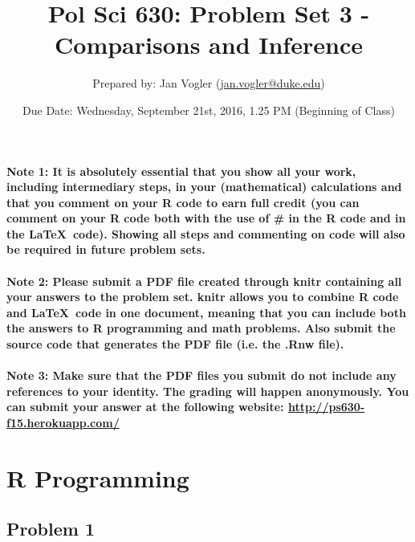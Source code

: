 \documentclass[12pt,letter]{article}
\begin{document}
\title{Pol Sci 630: Problem Set 3 - Comparisons and Inference}

\author{Prepared by: Jan Vogler (\href{mailto:jan.vogler@duke.edu}{jan.vogler@duke.edu})}

\date{Due Date: Wednesday, September 21st, 2016, 1.25 PM (Beginning of Class)}
 
\maketitle 



\paragraph{Note 1: It is absolutely essential that you show all your work, including intermediary steps, in your (mathematical) calculations and that you comment on your R code to earn full credit (you can comment on your R code both with the use of \# in the R code and in the \LaTeX \ code). Showing all steps and commenting on code will also be required in future problem sets.}

\paragraph{Note 2: Please submit a PDF file created through knitr containing all your answers to the problem set. knitr allows you to combine R code and \LaTeX \ code in one document, meaning that you can include both the answers to R programming and math problems. Also submit the source code that generates the PDF file (i.e. the .Rnw file).}

\paragraph{Note 3: Make sure that the PDF files you submit do not include any references to your identity. The grading will happen anonymously. You can submit your answer at the following website: \url{http://ps630-f15.herokuapp.com/}}



\section*{R Programming}

\subsection*{Problem 1}
\end{document}
